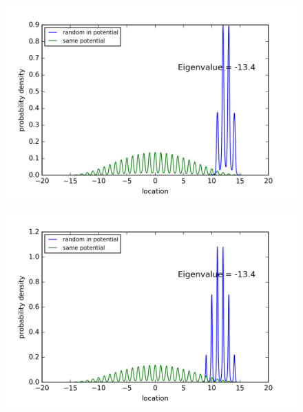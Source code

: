 \newpage
\begin{figure}[!htbh]
\centering
\begin{minipage}{.45\textwidth}
  \centering
  \includegraphics[width=1.1\linewidth]{RandomPotential2/10_0a_1th_Lowest_Rand0_4_0_5.png}
  \label{fig:randPoa10_1th_0.5_0.4}
\end{minipage}\qquad
\begin{minipage}{.45\textwidth}
  \centering
  \includegraphics[width=1.1\linewidth]{RandomPotential2/10_0a_1th_Lowest_Rand0_2_0_5.png}
  \label{fig:randPoa10_1th_0.5_0.2}
\end{minipage}
\end{figure}

